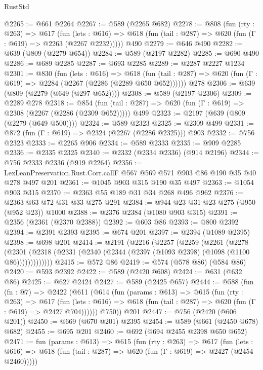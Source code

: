 \begin{lexlean}{RustStd}
\begin{coremodule}
{\begin{coremodule}
{{{{{{{{{@2265 := @661 @2264
@2267 := @589 (@2265 @682)
@2278 := @808
    (fun (rty : @263) =>
    @617
      (fun (lets : @616) =>
      @618 (fun (tail : @287) => @620 (fun (Γ : @619) => @2263 (@2267 @2232)))))
    @490
@2279 := @646 @490
@2282 := @639 (@809 (@2279 @654))
@2284 := @589 (@2197 @2282)
@2285 := @690 @490
@2286 := @689 @2285
@2287 := @693 @2285
@2289 := @2287 @2227 @1234
@2301 := @830
    (fun (lets : @616) =>
    @618 (fun (tail : @287) => @620 (fun (Γ : @619) => @2284 (@2267 (@2286 (@2289 @650 @652))))))
    @278
@2306 := @639 (@809 (@2279 (@649 (@297 @652))))
@2308 := @589 (@2197 @2306)
@2309 := @2289 @278
@2318 := @854
    (fun (tail : @287) => @620 (fun (Γ : @619) => @2308 (@2267 (@2286 (@2309 @652)))))
    @499
@2323 := @2197 (@639 (@809 (@2279 (@649 @500))))
@2324 := @589 @2323
@2325 := @2309 @499
@2331 := @872 (fun (Γ : @619) => @2324 (@2267 (@2286 @2325))) @903
@2332 := @756 @2323
@2333 := @2265 @906
@2334 := @589 @2333
@2335 := @909 @2285
@2336 := @2335 @2325
@2340 := @2332 (@2334 @2336) (@914 @2196)
@2344 := @756 @2333 @2336 (@919 @2264)
@2356 := LexLeanPreservation.Rust.Corr.callF @567 @569 @571 @903 @86 @190 @35 @40 @278 @497 @201
@2361 := @1045 @903 @315 @190 @35 @497
@2363 := @1054 @903 @315
@2370 := @2363 @55 @189 @31 @34 @268 @496 @962
@2376 := @2363 @63 @72 @31 @33 @275 @291
@2384 := @944 @23 @31 @23 @275 (@950 (@952 @23)) @1000
@2388 := @2376 @2384 (@1080 @903 @315)
@2391 := @2356 (@2361 (@2370 @2388))
@2392 := @603 @86
@2393 := @800 @2392
@2394 := @2391 @2393
@2395 := @674 @201
@2397 := @2394 (@1089 @2395)
@2398 := @698 @201
@2414 := @2191
    (@2216
      (@2257
        (@2259
          (@2261
            (@2278
              (@2301 (@2318 (@2331 (@2340 (@2344 (@2397 (@1093 @2398) (@1098 (@1100 @86)))))))))))))
@2415 := @572 @86
@2419 := @574 (@578 @86) (@584 @86)
@2420 := @593 @2392
@2422 := @589 (@2420 @608)
@2424 := @631 (@632 @86)
@2425 := @627 @2424
@2427 := @589 (@2425 @657)
@2444 := @588
    (fun (fn : @7) =>
    @2422
      (@611
        (@614
          (fun (params : @613) =>
          @615
            (fun (rty : @263) =>
            @617
              (fun (lets : @616) =>
              @618 (fun (tail : @287) => @620 (fun (Γ : @619) => @2427 @704))))))
        @750))
    @201
@2447 := @756 (@2420 (@606 @201))
@2450 := @669 (@670 @201) @2395
@2454 := @589 (@661 (@2450 @678) @682)
@2455 := @695 @201
@2460 := @692 (@694 @2455 @2398 @650 @652)
@2471 := fun (params : @613) =>
  @615
    (fun (rty : @263) =>
    @617
      (fun (lets : @616) =>
      @618 (fun (tail : @287) => @620 (fun (Γ : @619) => @2427 (@2454 @2460)))))
}}}}}}}}}
\end{coremodule}}
\end{coremodule}
\end{lexlean}
